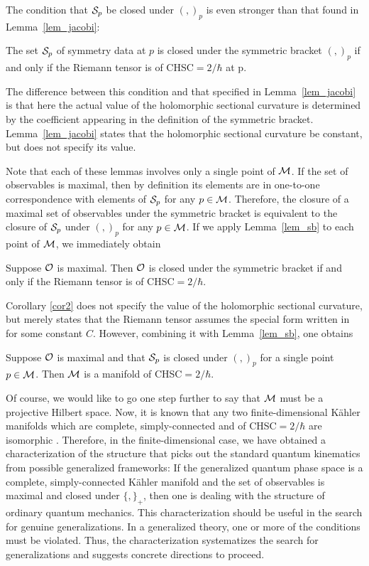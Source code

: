 The condition that ${\cal S}_p$ be closed under $( , )_p$ is even stronger
than that found in Lemma~\ref{lem_jacobi}:
%
\begin{lemma}\label{lem_sb}
The set ${\cal S}_p$ of symmetry data at $p$ is closed under
the symmetric bracket $( , )_p$ if and only if the Riemann
tensor is of CHSC$=2/\hbar$ at p.
\end{lemma}
%
The difference between this condition and that specified in
Lemma~\ref{lem_jacobi} is that here the actual value of the
holomorphic sectional curvature is determined by the coefficient
appearing in the definition of the symmetric bracket.
Lemma~\ref{lem_jacobi} states that the holomorphic sectional curvature
be constant, but does not specify its value.

Note that each of these lemmas involves only a single point of ${\cal M}$.
If the set of observables is maximal, then by definition its elements
are in one-to-one correspondence with elements of ${\cal S}_p$ for any
$p\in{\cal M}$.  Therefore, the closure of a maximal set of observables
under the symmetric bracket is equivalent to the closure of ${\cal
S}_p$ under $( , )_p$ for any $p\in{\cal M}$.  If we apply
Lemma~\ref{lem_sb} to each point of ${\cal M}$, we immediately obtain
%
\begin{cor}
Suppose ${\cal O}$ is maximal.  Then ${\cal O}$ is closed under
the symmetric bracket if and only if the Riemann tensor is
of CHSC$=2/\hbar$.
\end{cor}
%

Corollary \ref{cor2}  does not specify the value of the holomorphic
sectional curvature, but merely states that the Riemann tensor assumes
the special form written in  for some constant $C$.  However,
combining it with Lemma~\ref{lem_sb}, one obtains
%
\begin{theorem}
Suppose ${\cal O}$ is maximal and that ${\cal S}_p$ is
closed under $( , )_p$ for a single point $p\in{\cal M}$.  Then
${\cal M}$ is a manifold of CHSC$=2/\hbar$.

\end{theorem}

Of course, we would like to go one step further to say that ${\cal M}$ must
be a projective Hilbert space. Now, it is known that any two
finite-dimensional K\"ahler manifolds which are complete,
simply-connected and of CHSC$=2/\hbar$ are isomorphic \cite{yano}.
Therefore, in the finite-dimensional case, we have obtained a
characterization of the structure that picks out the standard quantum
kinematics from possible generalized frameworks: If the generalized
quantum phase space is a complete, simply-connected K\"ahler manifold
and the set of observables is maximal and closed under $\{ , \}_+$,
then one is dealing with the structure of ordinary quantum
mechanics. This characterization should be useful in the search for
genuine generalizations. In a generalized theory, one or more of the
conditions must be violated. Thus, the characterization systematizes
the search for generalizations and suggests concrete directions to
proceed.

